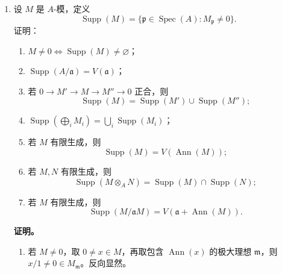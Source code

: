 \documentclass[a4paper]{ctexart}
\begin{document}
\begin{enumerate}[leftmargin=*, label=\textbf{3.\arabic*.}]
\textbf{证明。}
\begin{enumerate}[label=(\roman*)]
\item 由局部化的素理想对应，
\[
\operatorname{Spec}(S^{-1}A)\cong \{\mathfrak q\in \operatorname{Spec}(A):\mathfrak q\cap S=\varnothing\},
\]
这正是它在 \(\operatorname{Spec}(A)\) 中的像。

\item 在上述识别下，局部化后的谱映射显然就是原谱映射的限制。

\item 若 \(\mathfrak a\subseteq A\)，记 \(\mathfrak b=\mathfrak a^e\subseteq B\)，则
\[
\operatorname{Spec}(A/\mathfrak a)\cong V(\mathfrak a),\qquad
\operatorname{Spec}(B/\mathfrak b)\cong V(\mathfrak b),
\]
而诱导映射正是 \(f^*\) 在 \(V(\mathfrak b)\) 上的限制。

\item 取 \(S=A\setminus\mathfrak p\)。先在 \(\mathfrak p\) 处局部化，再对 \(S^{-1}\mathfrak p\) 取商，就得到纤维环
\[
B_{\mathfrak p}/\mathfrak p B_{\mathfrak p}.
\]
而
\[
B_{\mathfrak p}/\mathfrak p B_{\mathfrak p}\cong k(\mathfrak p)\otimes_A B,
\]
故得第二个同构。
\end{enumerate}

\setcounter{enumi}{18}
\item 设 \(M\) 是 \(A\)-模，定义
\[
\operatorname{Supp}(M)=\{\mathfrak p\in\operatorname{Spec}(A):M_{\mathfrak p}\neq 0\}.
\]
证明：
\begin{enumerate}[label=(\roman*)]
\item \(M\neq 0 \iff \operatorname{Supp}(M)\neq \varnothing\)；
\item \(\operatorname{Supp}(A/\mathfrak a)=V(\mathfrak a)\)；
\item 若 \(0\to M'\to M\to M''\to 0\) 正合，则
\[
\operatorname{Supp}(M)=\operatorname{Supp}(M')\cup \operatorname{Supp}(M'');
\]
\item \(\operatorname{Supp}(\bigoplus_i M_i)=\bigcup_i \operatorname{Supp}(M_i)\)；
\item 若 \(M\) 有限生成，则
\[
\operatorname{Supp}(M)=V(\operatorname{Ann}(M));
\]
\item 若 \(M,N\) 有限生成，则
\[
\operatorname{Supp}(M\otimes_A N)=\operatorname{Supp}(M)\cap \operatorname{Supp}(N);
\]
\item 若 \(M\) 有限生成，则
\[
\operatorname{Supp}(M/\mathfrak aM)=V(\mathfrak a+\operatorname{Ann}(M)).
\]
\end{enumerate}

\textbf{证明。}
\begin{enumerate}[label=(\roman*)]
\item 若 \(M\neq 0\)，取 \(0\neq x\in M\)，再取包含 \(\operatorname{Ann}(x)\) 的极大理想 \(\mathfrak m\)，则 \(x/1\neq 0\in M_{\mathfrak m}\)。反向显然。


\end{enumerate}
\end{enumerate}
\end{document}
